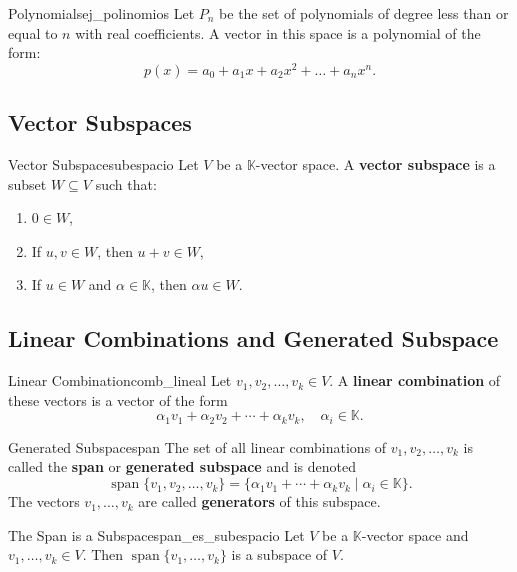 \documentclass[11pt, a4paper]{article}
\begin{document}
\begin{ejemplo}{Polynomials}{ej_polinomios}
Let $P_n$ be the set of polynomials of degree less than or equal to $n$ with real coefficients.
A vector in this space is a polynomial of the form:
\[
p(x) = a_0 + a_1 x + a_2 x^2 + \dots + a_n x^n.
\]
\end{ejemplo}

\subsection{Vector Subspaces}

\begin{definicion}{Vector Subspace}{subespacio}
Let $V$ be a $\mathbb{K}$-vector space. A \textbf{vector subspace} is a subset $W \subseteq V$ such that:
\begin{enumerate}
    \item $0 \in W$,
    \item If $u,v \in W$, then $u+v \in W$,
    \item If $u \in W$ and $\alpha \in \mathbb{K}$, then $\alpha u \in W$.
\end{enumerate}
\end{definicion}

\subsection{Linear Combinations and Generated Subspace}

\begin{definicion}{Linear Combination}{comb_lineal}
Let $v_1,v_2,\dots,v_k \in V$. A \textbf{linear combination} of these vectors is a vector of the form
\[
\alpha_1 v_1 + \alpha_2 v_2 + \cdots + \alpha_k v_k,
\quad \alpha_i \in \mathbb{K}.
\]
\end{definicion}

\begin{definicion}{Generated Subspace}{span}
The set of all linear combinations of $v_1,v_2,\dots,v_k$ is called the \textbf{span} or \textbf{generated subspace} and is denoted
\[
\operatorname{span}\{v_1,v_2,\dots,v_k\}
= \{ \alpha_1 v_1 + \cdots + \alpha_k v_k \mid \alpha_i \in \mathbb{K} \}.
\]
The vectors $v_1,\dots,v_k$ are called \textbf{generators} of this subspace.
\end{definicion}

\begin{proposicion}{The Span is a Subspace}{span_es_subespacio}
Let $V$ be a $\mathbb{K}$-vector space and $v_1,\dots,v_k \in V$. Then $\operatorname{span}\{v_1,\dots,v_k\}$ is a subspace of $V$.
\end{proposicion}
\end{document}
